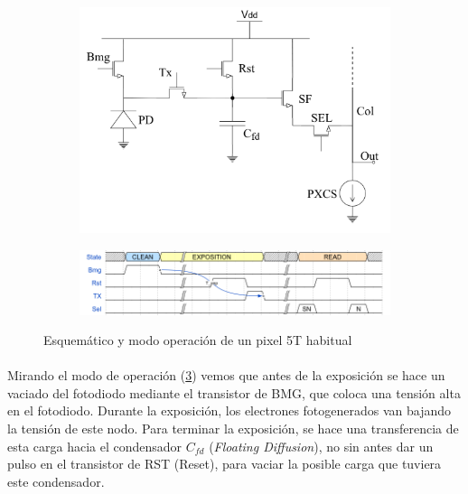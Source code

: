 \begin{figure}[h]
	\centering
	\begin{subfigure}{0.6\textwidth}
		\includegraphics[width=\textwidth]{img/pixel_5T.png}
		\caption{}
		\label{fig:pixel}
	\end{subfigure}

	\begin{subfigure}{\textwidth}
		\includegraphics[width=\textwidth]{img/pixel_wave.png}
		\caption{}
		\label{fig:pixel_op}
	\end{subfigure}
	\caption{Esquemático y modo operación de un pixel 5T habitual}
\end{figure}

\paragraph{}
Mirando el modo de operación (\ref{fig:pixel_op}) vemos que antes de la exposición se hace un vaciado del
fotodiodo mediante el transistor de BMG, que coloca una tensión alta en el fotodiodo.
Durante la exposición, los electrones fotogenerados van bajando la tensión de este
nodo. Para terminar la exposición, se hace una transferencia de esta carga hacia
el condensador $C_{fd}$ (\textit{Floating Diffusion}), no sin antes dar un pulso
en el transistor de RST (Reset), para vaciar la posible carga que tuviera este condensador.

